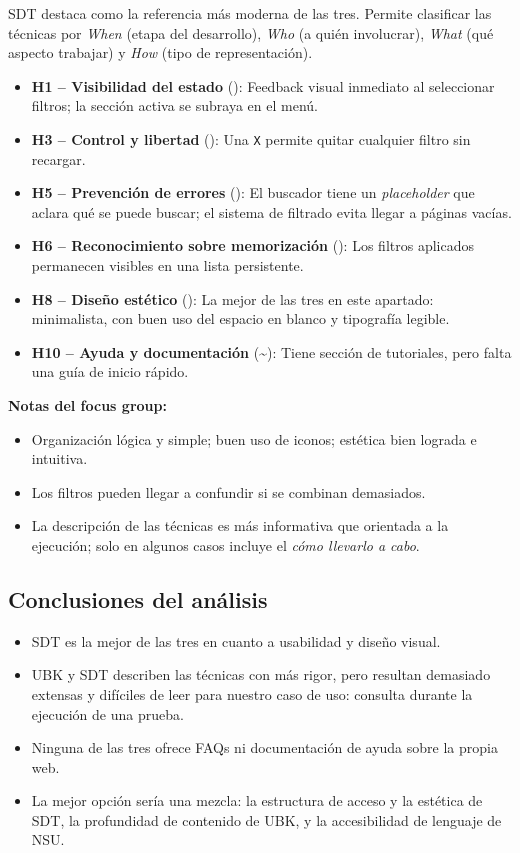 \documentclass[12pt, a4paper]{report}
\begin{document}
SDT destaca como la referencia más moderna de las tres. Permite clasificar las técnicas
por \textit{When} (etapa del desarrollo), \textit{Who} (a quién involucrar), \textit{What} (qué
aspecto trabajar) y \textit{How} (tipo de representación).

\begin{itemize}
  \item \textbf{H1 – Visibilidad del estado} (\checkmark): Feedback visual inmediato al
    seleccionar filtros; la sección activa se subraya en el menú.
  \item \textbf{H3 – Control y libertad} (\checkmark): Una \texttt{X} permite quitar cualquier
    filtro sin recargar.
  \item \textbf{H5 – Prevención de errores} (\checkmark): El buscador tiene un
    \textit{placeholder} que aclara qué se puede buscar; el sistema de filtrado evita
    llegar a páginas vacías.
  \item \textbf{H6 – Reconocimiento sobre memorización} (\checkmark): Los filtros aplicados
    permanecen visibles en una lista persistente.
  \item \textbf{H8 – Diseño estético} (\checkmark): La mejor de las tres en este apartado:
    minimalista, con buen uso del espacio en blanco y tipografía legible.
  \item \textbf{H10 – Ayuda y documentación} (\textasciitilde): Tiene sección de tutoriales,
    pero falta una guía de inicio rápido.
\end{itemize}

\textbf{Notas del focus group:}
\begin{itemize}
  \item Organización lógica y simple; buen uso de iconos; estética bien lograda e intuitiva.
  \item Los filtros pueden llegar a confundir si se combinan demasiados.
  \item La descripción de las técnicas es más informativa que orientada a la ejecución;
    solo en algunos casos incluye el \textit{cómo llevarlo a cabo}.
\end{itemize}

\subsection{Conclusiones del análisis}
\label{sec:conclusiones-analisis}

\begin{itemize}
  \item SDT es la mejor de las tres en cuanto a usabilidad y diseño visual.
  \item UBK y SDT describen las técnicas con más rigor, pero resultan demasiado extensas y
    difíciles de leer para nuestro caso de uso: consulta durante la ejecución de una prueba.
  \item Ninguna de las tres ofrece FAQs ni documentación de ayuda sobre la propia web.
  \item La mejor opción sería una mezcla: la estructura de acceso y la estética de SDT, la
    profundidad de contenido de UBK, y la accesibilidad de lenguaje de NSU.
\end{itemize}
\end{document}
